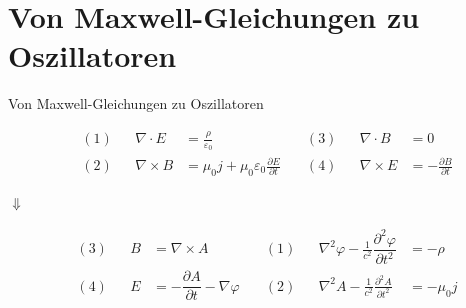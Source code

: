 \documentclass{beamer}
\begin{document}
\section{Von Maxwell-Gleichungen zu Oszillatoren}
\begin{frame}[t]{Von Maxwell-Gleichungen zu Oszillatoren}
	\vspace*{-0.5cm}
	\begin{center}
		\begin{minipage}{0.35\textwidth}
			\begin{align*}
			\quad(1) &&\nabla\cdot E &= \frac{\rho}{\varepsilon_0} &
			\quad(3) &&\nabla\cdot B &=0 \\
			\quad(2) &&\nabla\times B &= \mu_0 j  + \mu_0 \varepsilon_0\frac{\partial E}{\partial t}&
			\quad(4) && \nabla\times E &= -\frac{\partial B }{\partial t}
			\end{align*}
		\end{minipage}
		
		\vspace*{0.5cm}
		$\Downarrow$
		
		\begin{minipage}{0.35\textwidth}
			\begin{align*}
			\quad(3) && B &= \nabla\times A &
			\quad(1) &&\nabla^2 \varphi - \frac{1}{c^2} \dfrac{\partial^2 \varphi}{\partial t^2} &= -\rho\\
			\quad(4) && E &= -\dfrac{\partial A}{\partial t} - \nabla \varphi &
			\quad(2) && \nabla^2 A - \frac{1}{c^2} \frac{\partial^2 A }{\partial t^2} &= - \mu_0 j
			\end{align*}
		\end{minipage}
	\end{center}
\end{frame}
\end{document}
